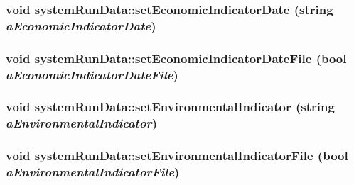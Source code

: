 \label{classsystem_run_data_aa433850561e78296dbb6db231c1d5318}
\hypertarget{classsystem_run_data_a6f7742228596337028e277054adf9c7b}{
\subsubsection[{setEconomicIndicatorDate}]{\setlength{\rightskip}{0pt plus 5cm}void systemRunData::setEconomicIndicatorDate (string {\em aEconomicIndicatorDate})}}
\label{classsystem_run_data_a6f7742228596337028e277054adf9c7b}
\hypertarget{classsystem_run_data_a7d39926c39f7f18df61263af1a25fb80}{
\subsubsection[{setEconomicIndicatorDateFile}]{\setlength{\rightskip}{0pt plus 5cm}void systemRunData::setEconomicIndicatorDateFile (bool {\em aEconomicIndicatorDateFile})}}
\label{classsystem_run_data_a7d39926c39f7f18df61263af1a25fb80}
\hypertarget{classsystem_run_data_a3d9492ef34cf74ea73edf84ff810778e}{
\subsubsection[{setEnvironmentalIndicator}]{\setlength{\rightskip}{0pt plus 5cm}void systemRunData::setEnvironmentalIndicator (string {\em aEnvironmentalIndicator})}}
\label{classsystem_run_data_a3d9492ef34cf74ea73edf84ff810778e}
\hypertarget{classsystem_run_data_abf669a871b0827b06932cb78fafcc8af}{
\subsubsection[{setEnvironmentalIndicatorFile}]{\setlength{\rightskip}{0pt plus 5cm}void systemRunData::setEnvironmentalIndicatorFile (bool {\em aEnvironmentalIndicatorFile})}}
